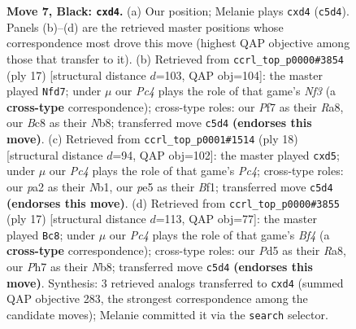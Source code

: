 \documentclass[11pt]{article}
\begin{document}
\begin{figure}[p]
\caption{\textbf{Move 7, Black: \texttt{cxd4}.} (a) Our position; Melanie plays \texttt{cxd4} (\texttt{c5d4}). Panels (b)--(d) are the retrieved master positions whose correspondence most drove this move (highest QAP objective among those that transfer to it). (b) Retrieved from \texttt{ccrl\_top\_p0000\#3854} (ply 17) [structural distance $d$=103, QAP obj=104]: the master played \texttt{Nfd7}; under $\mu$ our \emph{Pc4} plays the role of that game's \emph{Nf3} (a \textbf{cross-type} correspondence); cross-type roles: our \emph{P}f7 as their \emph{R}a8, our \emph{B}c8 as their \emph{N}b8; transferred move \texttt{c5d4} \textbf{(endorses this move)}. (c) Retrieved from \texttt{ccrl\_top\_p0001\#1514} (ply 18) [structural distance $d$=94, QAP obj=102]: the master played \texttt{cxd5}; under $\mu$ our \emph{Pc4} plays the role of that game's \emph{Pc4}; cross-type roles: our \emph{p}a2 as their \emph{N}b1, our \emph{p}e5 as their \emph{B}f1; transferred move \texttt{c5d4} \textbf{(endorses this move)}. (d) Retrieved from \texttt{ccrl\_top\_p0000\#3855} (ply 17) [structural distance $d$=113, QAP obj=77]: the master played \texttt{Bc8}; under $\mu$ our \emph{Pc4} plays the role of that game's \emph{Bf4} (a \textbf{cross-type} correspondence); cross-type roles: our \emph{P}d5 as their \emph{R}a8, our \emph{P}h7 as their \emph{N}b8; transferred move \texttt{c5d4} \textbf{(endorses this move)}. Synthesis: 3 retrieved analogs transferred to \texttt{cxd4} (summed QAP objective 283, the strongest correspondence among the candidate moves); Melanie committed it via the \texttt{search} selector.}
\label{fig:thought-m13}
\end{figure}

\clearpage
\end{document}
